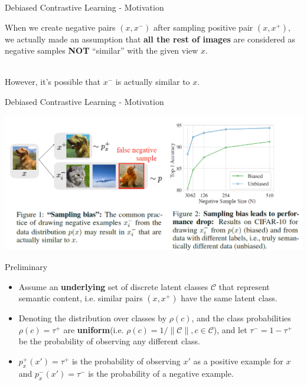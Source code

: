\documentclass[aspectratio=169,mathserif]{beamer}  %
\newcommand{\tb}{\textbf}
\begin{document}
\begin{frame}{Debiased Contrastive Learning - Motivation}

When we create negative pairs $(x,x^-)$ after sampling positive pair $(x,x^+)$, we actually made an assumption that \tb{all the rest of images} are considered as negative samples \tb{NOT} ``similar'' with the given view $x$.

\pause

~\\
However, it's possible that $x^-$ is actually similar to $x$. 
    
\end{frame} 



\begin{frame}{Debiased Contrastive Learning - Motivation}

\begin{center}
    \includegraphics[width=0.9\linewidth]{figure15.png}
\end{center}
    
\end{frame}



\begin{frame}{Preliminary}

\begin{itemize}[<+->]
    \item Assume an \tb{underlying} set of discrete latent classes $\mathcal{C}$ that represent semantic content, i.e. similar pairs $(x,x^+)$ have the same latent class.
    \item Denoting the distribution over classes by $\rho(c)$, and the class probabilities $\rho(c)=\tau^+$ are \tb{uniform}(i.e. $\rho(c)=1/\|\mathcal{C}\|, c\in\mathcal{C}$), and let $\tau^-=1-\tau^+$ be the probability of observing any different class.
    \item $p_x^+(x')=\tau^+$ is the probability of observing $x'$ as a positive example for $x$ and $p_x^-(x')=\tau^-$ is the probability of a negative example.
\end{itemize}

\end{frame}
\end{document}
